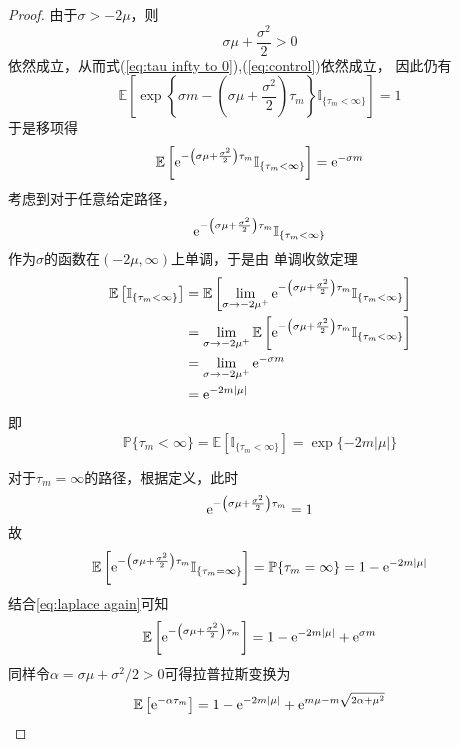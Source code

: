 \documentclass[cn]{homework}
\newcommand{\E}{\mathbb E}
\begin{document}
\begin{subproblem}
        \item
        \begin{proof}
            由于$\sigma>-2\mu$，则
            \[\sigma\mu+\frac{\sigma^2}{2}>0\]
            依然成立，从而式(\ref{eq:tau infty to 0}),(\ref{eq:control})依然成立，
            因此仍有
            \[\E\left[
                \exp\left\{
                    \sigma m-\left(\sigma\mu+\frac{\sigma^2}{2}\right)\tau_m
                    \right\}
                \mathbb I_{\{\tau_m<\infty\}}
            \right]=1\]
            于是移项得
            \begin{equation}
                \label{eq:laplace again}
                \E\left[\e^{-\left(\sigma\mu+\frac{\sigma^2}{2}\right)\tau_m}
                \mathbb I_{\{\tau_m<\infty\}}\right]
                =\e^{-\sigma m}
            \end{equation}
            考虑到对于任意给定路径，
            \[\mathrm e^{-\left(\sigma\mu+\frac{\sigma^2}{2}\right)\tau_m}
            \mathbb I_{\{\tau_m<\infty\}}\]
            作为$\sigma$的函数在$(-2\mu,\infty)$上单调，于是由
            单调收敛定理
            \[\begin{aligned}
                \E\left[\mathbb I_{\{\tau_m<\infty\}}\right]
                &=
                \E\left[
                \lim_{\sigma\to -2\mu^+}
                \e^{-\left(\sigma\mu+\frac{\sigma^2}{2}\right)\tau_m}
                \mathbb I_{\{\tau_m<\infty\}}
                \right]\\
                &=\lim_{\sigma\to -2\mu^+}
                \E\left[
                \e^{-\left(\sigma\mu+\frac{\sigma^2}{2}\right)\tau_m}
                \mathbb I_{\{\tau_m<\infty\}}
                \right]\\
                &=\lim_{\sigma\to -2\mu^+}\e^{-\sigma m}\\
                &=\e^{-2m|\mu|}
            \end{aligned}\]
            即
            \[\mathbb P\{\tau_m<\infty\}
            =\E\left[\mathbb I_{\{\tau_m<\infty\}}\right]
            =\exp\{-2m|\mu|\}\]

            对于$\tau_m=\infty$的路径，根据定义，此时
            \[\mathrm e^{-\left(\sigma\mu+\frac{\sigma^2}{2}\right)\tau_m}
            =1\]
            故
            \[\E\left[\e^{-\left(\sigma\mu+\frac{\sigma^2}{2}\right)\tau_m}
            \mathbb I_{\{\tau_m=\infty\}}\right]=
            \mathbb P\{\tau_m=\infty\}=1-\e^{-2m|\mu|}\]
            结合\cref{eq:laplace again}可知
            \[\E\left[\e^{-\left(\sigma\mu+\frac{\sigma^2}{2}\right)\tau_m}\right]
            =1-\e^{-2m|\mu|}+\e^{\sigma m}\]
            同样令$\alpha=\sigma\mu+\sigma^2/2>0$可得拉普拉斯变换为
            \[\E\left[\e^{-\alpha\tau_m}\right]
            =1-\e^{-2m|\mu|}+\e^{m\mu-m\sqrt{2\alpha+\mu^2}}\]
        \end{proof}
    \end{subproblem}
\end{document}
